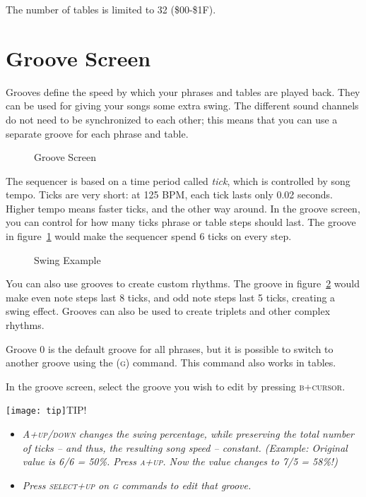 The number of tables is limited to 32 (\$00-\$1F).

\section{Groove Screen}

Grooves define the speed by which your phrases and tables are played back. They can be used for giving your songs some extra swing. The different sound channels do not need to be synchronized to each other; this means that you can use a separate groove for each phrase and table.

\begin{figure}[htbp]
	\begin{center}
	\end{center}
	\caption{Groove Screen}
	\label{fig:groove}
\end{figure}

The sequencer is based on a time period called \emph{tick}, which is controlled by song tempo. Ticks are very short: at 125 BPM, each tick lasts only 0.02 seconds. Higher tempo means faster ticks, and the other way around. In the groove screen, you can control for how many ticks phrase or table steps should last.
The groove in figure~\ref{fig:groove} would make the sequencer spend 6 ticks on every step.

\begin{figure}[htbp]
	\begin{center}
	\end{center}
	\caption{Swing Example}
	\label{fig:groove-swing}
\end{figure}

You can also use grooves to create custom rhythms. The groove in figure~\ref{fig:groove-swing} would make even note steps last 8 ticks, and odd note steps last 5 ticks, creating a swing effect. Grooves can also be used to create triplets and other complex rhythms.

Groove 0 is the default groove for all phrases, but it is possible to switch to another groove using the (\textsc{g}) command. This command also works in tables.

In the groove screen, select the groove you wish to edit by pressing \textsc{b+cursor}.

\texttt{[image: tip]}TIP!
\begin{itemize}
	\item \textit{ \textsc{A+up/down} changes the swing percentage, while preserving the total number of ticks -- and thus, the resulting song speed -- constant. (Example: Original value is 6/6 = 50\%. Press \textsc{a+up}. Now the value changes to 7/5 = 58\%!) }
    \item \textit{ Press \textsc{select+up} on \textsc{g} commands to edit that groove. }
\end{itemize}

